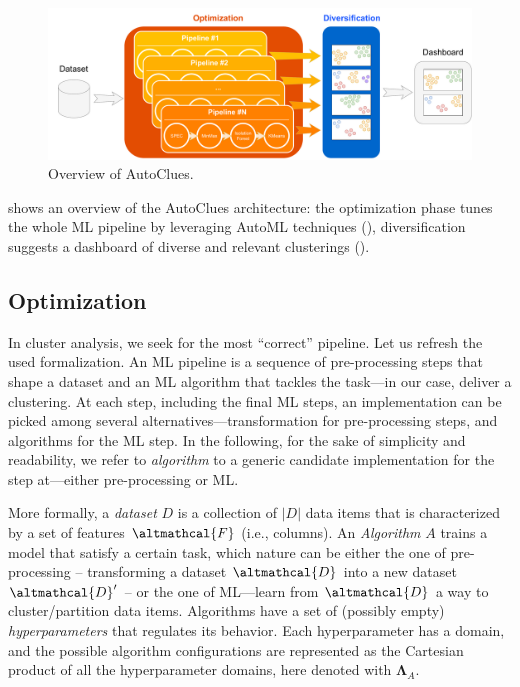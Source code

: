 \begin{figure}[t]
    \centering
    \includegraphics[scale=.26]{chapters/data-centric/unsupervised/img/approach.pdf}
    \caption{Overview of AutoClues.}
    \label{clustering-fig:overview}
\end{figure}

 shows an overview of the AutoClues architecture:  the optimization phase tunes the whole ML pipeline by leveraging AutoML techniques (), diversification suggests a dashboard of diverse and relevant clusterings ().

\subsection{Optimization}
\label{clustering-ssec:automl}

In cluster analysis, we seek for the most ``correct'' pipeline.
Let us refresh the used formalization.
An ML pipeline is a sequence of pre-processing steps that shape a dataset and an ML algorithm that tackles the task---in our case, deliver a clustering.
At each step, including the final ML steps, an implementation can be picked among several alternatives---transformation for pre-processing steps, and algorithms for the ML step.
In the following, for the sake of simplicity and readability, we refer to \textit{algorithm} to a generic candidate implementation for the step at---either pre-processing or ML.

More formally, a \textit{dataset} $D$ is a collection of $|D|$ data items that is characterized by a set of features $\altmathcal{F}$ (i.e., columns).
An \textit{Algorithm} $A$ trains a model that satisfy a certain task, which nature can be either the one of pre-processing -- transforming a dataset $\altmathcal{D}$ into a new dataset $\altmathcal{D}'$ -- or the one of ML---learn from $\altmathcal{D}$ a way to cluster/partition data items.
Algorithms have a set of (possibly empty) \textit{hyperparameters} that regulates its behavior.
Each hyperparameter has a domain, and the possible algorithm configurations are represented as the Cartesian product of all the hyperparameter domains, here denoted with $\pmb{\Lambda}_A$.

